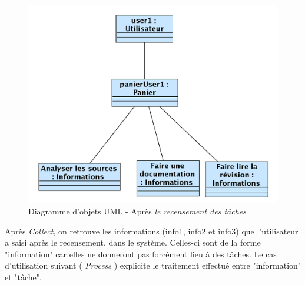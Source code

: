 \begin{figure}[H]
	\begin{center}
	\includegraphics[scale=0.3]{diagrams/InstantaneCollectAfter.png}
	\caption{Diagramme d'objets UML  - Après \textit{le recensement des tâches}}
	\end{center}
	\end{figure}
	
	\bigskip
	

	Après \textit{Collect}, on retrouve les informations (info1, info2 et info3) que l'utilisateur a saisi après le recensement, dans le système. Celles-ci sont de la forme "information" car elles ne donneront pas forcément lieu à des tâches. Le cas d'utilisation suivant ( \textit{Process} ) explicite le traitement effectué entre "information" et "tâche".
